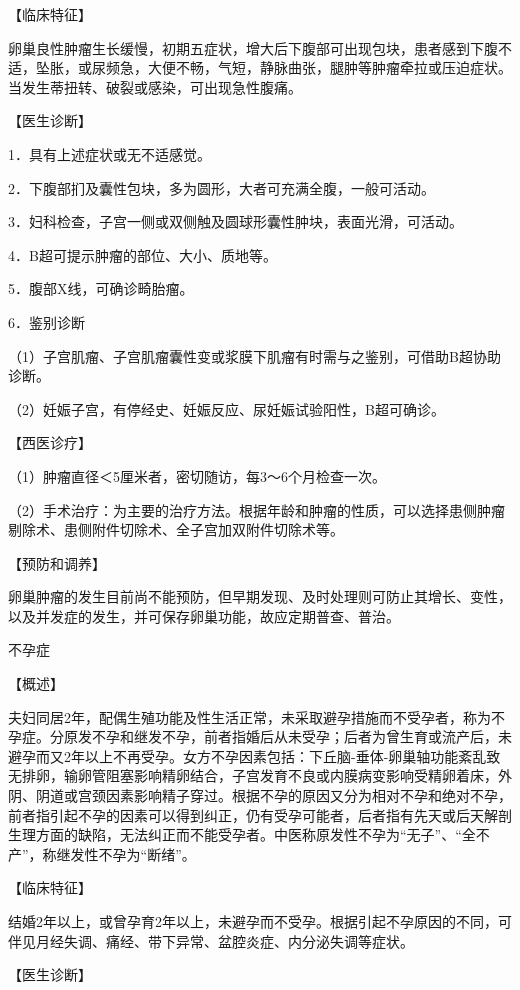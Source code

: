 \documentclass[12pt,UTF8]{ctexbook}
\begin{document}
【临床特征】

卵巢良性肿瘤生长缓慢，初期五症状，增大后下腹部可出现包块，患者感到下腹不适，坠胀，或尿频急，大便不畅，气短，静脉曲张，腿肿等肿瘤牵拉或压迫症状。当发生蒂扭转、破裂或感染，可出现急性腹痛。

【医生诊断】

1．具有上述症状或无不适感觉。

2．下腹部扪及囊性包块，多为圆形，大者可充满全腹，一般可活动。

3．妇科检查，子宫一侧或双侧触及圆球形囊性肿块，表面光滑，可活动。

4．B超可提示肿瘤的部位、大小、质地等。

5．腹部X线，可确诊畸胎瘤。

6．鉴别诊断

（1）子宫肌瘤、子宫肌瘤囊性变或浆膜下肌瘤有时需与之鉴别，可借助B超协助诊断。

（2）妊娠子宫，有停经史、妊娠反应、尿妊娠试验阳性，B超可确诊。

【西医诊疗】

（1）肿瘤直径＜5厘米者，密切随访，每3～6个月检查一次。

（2）手术治疗：为主要的治疗方法。根据年龄和肿瘤的性质，可以选择患侧肿瘤剔除术、患侧附件切除术、全子宫加双附件切除术等。

【预防和调养】

卵巢肿瘤的发生目前尚不能预防，但早期发现、及时处理则可防止其增长、变性，以及并发症的发生，并可保存卵巢功能，故应定期普查、普治。





不孕症


【概述】

夫妇同居2年，配偶生殖功能及性生活正常，未采取避孕措施而不受孕者，称为不孕症。分原发不孕和继发不孕，前者指婚后从未受孕；后者为曾生育或流产后，未避孕而又2年以上不再受孕。女方不孕因素包括：下丘脑-垂体-卵巢轴功能紊乱致无排卵，输卵管阻塞影响精卵结合，子宫发育不良或内膜病变影响受精卵着床，外阴、阴道或宫颈因素影响精子穿过。根据不孕的原因又分为相对不孕和绝对不孕，前者指引起不孕的因素可以得到纠正，仍有受孕可能者，后者指有先天或后天解剖生理方面的缺陷，无法纠正而不能受孕者。中医称原发性不孕为“无子”、“全不产”，称继发性不孕为“断绪”。

【临床特征】

结婚2年以上，或曾孕育2年以上，未避孕而不受孕。根据引起不孕原因的不同，可伴见月经失调、痛经、带下异常、盆腔炎症、内分泌失调等症状。

【医生诊断】
\end{document}

